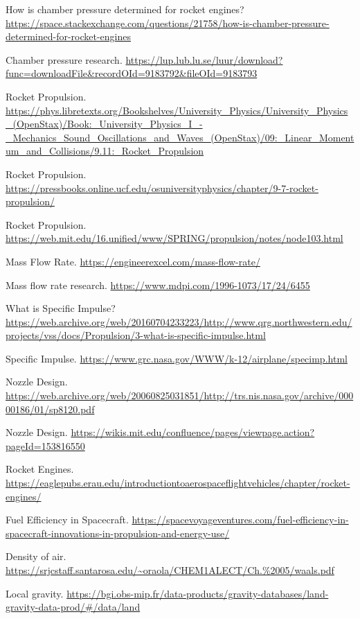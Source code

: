 \documentclass[12pt,a4paper]{article}
\begin{document}
\begin{thebibliography}{99}

How is chamber pressure determined for rocket engines? \url{https://space.stackexchange.com/questions/21758/how-is-chamber-pressure-determined-for-rocket-engines}

Chamber pressure research. \url{https://lup.lub.lu.se/luur/download?func=downloadFile&recordOId=9183792&fileOId=9183793}

Rocket Propulsion. \url{https://phys.libretexts.org/Bookshelves/University_Physics/University_Physics_(OpenStax)/Book:_University_Physics_I_-_Mechanics_Sound_Oscillations_and_Waves_(OpenStax)/09:_Linear_Momentum_and_Collisions/9.11:_Rocket_Propulsion}

Rocket Propulsion. \url{https://pressbooks.online.ucf.edu/osuniversityphysics/chapter/9-7-rocket-propulsion/}

Rocket Propulsion. \url{https://web.mit.edu/16.unified/www/SPRING/propulsion/notes/node103.html}

Mass Flow Rate. \url{https://engineerexcel.com/mass-flow-rate/}

Mass flow rate research. \url{https://www.mdpi.com/1996-1073/17/24/6455}

What is Specific Impulse? \url{https://web.archive.org/web/20160704233223/http://www.qrg.northwestern.edu/projects/vss/docs/Propulsion/3-what-is-specific-impulse.html}

Specific Impulse. \url{https://www.grc.nasa.gov/WWW/k-12/airplane/specimp.html}

Nozzle Design. \url{https://web.archive.org/web/20060825031851/http://trs.nis.nasa.gov/archive/00000186/01/sp8120.pdf}

Nozzle Design. \url{https://wikis.mit.edu/confluence/pages/viewpage.action?pageId=153816550}

Rocket Engines. \url{https://eaglepubs.erau.edu/introductiontoaerospaceflightvehicles/chapter/rocket-engines/}

Fuel Efficiency in Spacecraft. \url{https://spacevoyageventures.com/fuel-efficiency-in-spacecraft-innovations-in-propulsion-and-energy-use/}

Density of air. \url{https://srjcstaff.santarosa.edu/~oraola/CHEM1ALECT/Ch.%2005/waals.pdf}

Local gravity. \url{https://bgi.obs-mip.fr/data-products/gravity-databases/land-gravity-data-prod/#/data/land}

\end{thebibliography}
\end{document}
